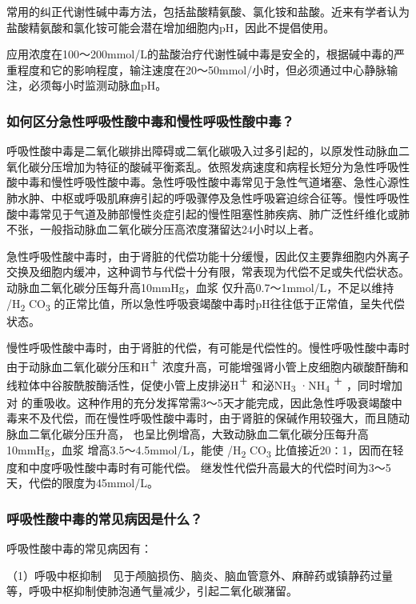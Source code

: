 常用的纠正代谢性碱中毒方法，包括盐酸精氨酸、氯化铵和盐酸。近来有学者认为盐酸精氨酸和氯化铵可能会潜在增加细胞内pH，因此不提倡使用。

应用浓度在100～200mmol/L的盐酸治疗代谢性碱中毒是安全的，根据碱中毒的严重程度和它的影响程度，输注速度在20～50mmol/小时，但必须通过中心静脉输注，必须每小时监测动脉血pH。

\subsubsection{如何区分急性呼吸性酸中毒和慢性呼吸性酸中毒？}

呼吸性酸中毒是二氧化碳排出障碍或二氧化碳吸入过多引起的，以原发性动脉血二氧化碳分压增加为特征的酸碱平衡紊乱。依照发病速度和病程长短分为急性呼吸性酸中毒和慢性呼吸性酸中毒。急性呼吸性酸中毒常见于急性气道堵塞、急性心源性肺水肿、中枢或呼吸肌麻痹引起的呼吸骤停及急性呼吸窘迫综合征等。慢性呼吸性酸中毒常见于气道及肺部慢性炎症引起的慢性阻塞性肺疾病、肺广泛性纤维化或肺不张，一般指动脉血二氧化碳分压高浓度潴留达24小时以上者。

急性呼吸性酸中毒时，由于肾脏的代偿功能十分缓慢，因此仅主要靠细胞内外离子交换及细胞内缓冲，这种调节与代偿十分有限，常表现为代偿不足或失代偿状态。动脉血二氧化碳分压每升高10mmHg，血浆
仅升高0.7～1mmol/L，不足以维持
/H\textsubscript{2} CO\textsubscript{3}
的正常比值，所以急性呼吸衰竭酸中毒时pH往往低于正常值，呈失代偿状态。

慢性呼吸性酸中毒时，由于肾脏的代偿，有可能是代偿性的。慢性呼吸性酸中毒时由于动脉血二氧化碳分压和H\textsuperscript{＋}
浓度升高，可能增强肾小管上皮细胞内碳酸酐酶和线粒体中谷胺酰胺酶活性，促使小管上皮排泌H\textsuperscript{＋}
和泌NH\textsubscript{3} ·NH\textsubscript{4} \textsuperscript{＋}
，同时增加对
的重吸收。这种作用的充分发挥常需3～5天才能完成，因此急性呼吸衰竭酸中毒来不及代偿，而在慢性呼吸性酸中毒时，由于肾脏的保碱作用较强大，而且随动脉血二氧化碳分压升高，
也呈比例增高，大致动脉血二氧化碳分压每升高10mmHg，血浆
增高3.5～4.5mmol/L，能使
/H\textsubscript{2} CO\textsubscript{3}
比值接近20∶1，因而在轻度和中度呼吸性酸中毒时有可能代偿。
继发性代偿升高最大的代偿时间为3～5天，代偿的限度为45mmol/L。

\subsubsection{呼吸性酸中毒的常见病因是什么？}

呼吸性酸中毒的常见病因有：

（1）呼吸中枢抑制　见于颅脑损伤、脑炎、脑血管意外、麻醉药或镇静药过量等，呼吸中枢抑制使肺泡通气量减少，引起二氧化碳潴留。

